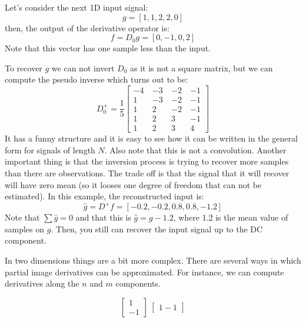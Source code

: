 Let's consider the next 1D input signal:
\begin{equation}
	g = \left[1, 1, 2, 2, 0\right]
\end{equation}
then, the output of the derivative operator is:
\begin{equation}
	f=D_0g=\left[0, -1, 0, 2\right]
\end{equation}
Note that this vector has one sample less than the input.

To recover $g$ we can not invert $D_0$ as it is not a square matrix, but we can compute the pseudo inverse which turns out to be:
\begin{equation}
	D_0^{+} = \frac{1}{5}
	\begin{bmatrix}
		-4 ~ & -3 ~ & -2~  & -1 \\
		1 ~  & -3 ~ & -2 ~ & -1 \\
		1~   & 2 ~  & -2 ~ & -1 \\
		1~   & 2 ~  & 3 ~  & -1 \\
		1~   & 2 ~  & 3 ~  & 4
	\end{bmatrix}
\end{equation}
It has a funny structure and it is easy to see how it can be written in the general form for signals of length $N$. Also note that this is not a convolution.
Another important thing is that the inversion process is trying to recover more samples than there are observations. The trade off is that the signal that it will recover will have zero mean (so it looses one degree of freedom that can not be estimated). In this example, the reconstructed input is:
\begin{equation}
	\hat g = D^{+} f= \left[-0.2, -0.2, 0.8, 0.8, -1.2\right]
\end{equation}
Note that $\sum \hat g = 0$ and that this is $\hat g = g - 1.2$, where 1.2 is the mean value of samples on $g$.
Then, you still can recover the input signal up to the DC component.

In two dimensions things are a bit more complex. There are several ways in which partial image derivatives can be approximated. For instance, we can compute derivatives along the $n$ and $m$ components.

\begin{equation}
	\begin{bmatrix}
		1 \\
		-1
	\end{bmatrix}
	~
	\begin{bmatrix}
		1 -1
	\end{bmatrix}
\end{equation}

